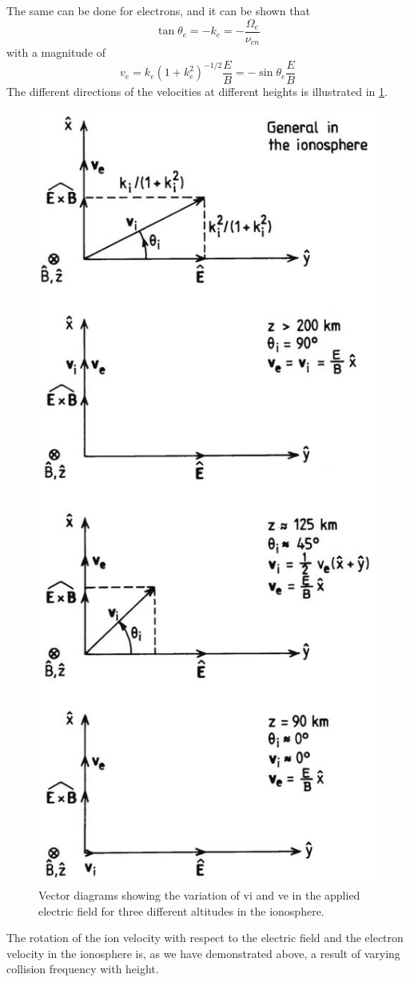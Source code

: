 The same can be done for electrons, and it can be shown that
\begin{equation*}
    \tan\theta_e=-k_e=-\frac{\Omega_e}{\nu_{en}}
\end{equation*}
with a magnitude of
\begin{equation*}
    v_e=k_e{\left(1+k_e^2\right)}^{-1/2}\frac{E}{B}=-\sin\theta_e\frac{E}{B}
\end{equation*}
The different directions of the velocities at different heights is illustrated in \cref{fig:L14_v_i_v_e_electric_field}.
\begin{figure}[t]
    \centering
    \includegraphics[width=.4\linewidth]{bilder/L14_v_i_v_e_electric_field.jpg}
    \caption{Vector diagrams showing the variation of vi and ve in the applied electric field for three different altitudes in the ionosphere.}\label{fig:L14_v_i_v_e_electric_field}
\end{figure}
The rotation of the ion velocity with respect to the electric field and the electron velocity in the ionosphere is, as we have demonstrated above, a result of varying collision frequency with height.

